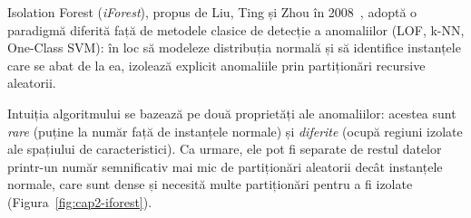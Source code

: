 Isolation Forest (\textit{iForest}), propus de Liu, Ting și Zhou în 2008~\cite{liu2008iforest},
adoptă o paradigmă diferită față de metodele clasice de detecție a anomaliilor (LOF, k-NN,
One-Class SVM): în loc să modeleze distribuția normală și să identifice instanțele care se
abat de la ea, izolează explicit anomaliile prin partiționări recursive aleatorii.

Intuiția algoritmului se bazează pe două proprietăți ale anomaliilor: acestea sunt \textit{rare}
(puține la număr față de instanțele normale) și \textit{diferite} (ocupă regiuni izolate ale
spațiului de caracteristici). Ca urmare, ele pot fi separate de restul datelor printr-un număr
semnificativ mai mic de partiționări aleatorii decât instanțele normale, care sunt dense și
necesită multe partiționări pentru a fi izolate~\cite{liu2012isolation}
(Figura~\ref{fig:cap2-iforest}).

